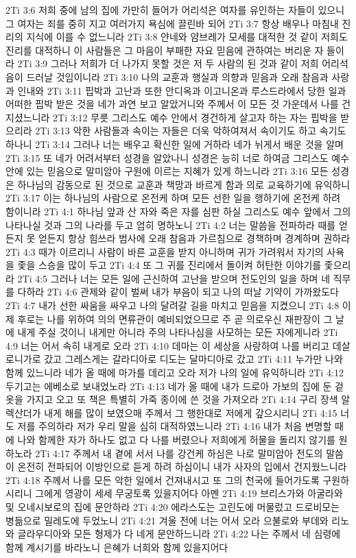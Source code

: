 2Ti 3:6  저희 중에 남의 집에 가만히 들어가 어리석은 여자를 유인하는 자들이 있으니 그 여자는 죄를 중히 지고 여러가지 욕심에 끌린바 되어
2Ti 3:7  항상 배우나 마침내 진리의 지식에 이를 수 없느니라
2Ti 3:8  얀네와 얌브레가 모세를 대적한 것 같이 저희도 진리를 대적하니 이 사람들은 그 마음이 부패한 자요 믿음에 관하여는 버리운 자 들이라
2Ti 3:9  그러나 저희가 더 나가지 못할 것은 저 두 사람의 된 것과 같이 저희 어리석음이 드러날 것임이니라
2Ti 3:10  나의 교훈과 행실과 의향과 믿음과 오래 참음과 사랑과 인내와
2Ti 3:11  핍박과 고난과 또한 안디옥과 이고니온과 루스드라에서 당한 일과 어떠한 핍박 받은 것을 네가 과연 보고 알았거니와 주께서 이 모든 것 가운데서 나를 건지셨느니라
2Ti 3:12  무릇 그리스도 예수 안에서 경건하게 살고자 하는 자는 핍박을 받으리라
2Ti 3:13  악한 사람들과 속이는 자들은 더욱 악하여져서 속이기도 하고 속기도 하나니
2Ti 3:14  그러나 너는 배우고 확신한 일에 거하라 네가 뉘게서 배운 것을 알며
2Ti 3:15  또 네가 어려서부터 성경을 알았나니 성경은 능히 너로 하여금 그리스도 예수 안에 있는 믿음으로 말미암아 구원에 이르는 지혜가 있게 하느니라
2Ti 3:16  모든 성경은 하나님의 감동으로 된 것으로 교훈과 책망과 바르게 함과 의로 교육하기에 유익하니
2Ti 3:17  이는 하나님의 사람으로 온전케 하며 모든 선한 일을 행하기에 온전케 하려 함이니라
2Ti 4:1  하나님 앞과 산 자와 죽은 자를 심판 하실 그리스도 예수 앞에서 그의 나타나실 것과 그의 나라를 두고 엄히 명하노니
2Ti 4:2  너는 말씀을 전파하라 때를 얻든지 못 얻든지 항상 힘쓰라 범사에 오래 참음과 가르침으로 경책하며 경계하며 권하라
2Ti 4:3  때가 이르리니 사람이 바른 교훈을 받지 아니하며 귀가 가려워서 자기의 사욕을 좇을 스승을 많이 두고
2Ti 4:4  또 그 귀를 진리에서 돌이켜 허탄한 이야기를 좇으리라
2Ti 4:5  그러나 너는 모든 일에 근신하여 고난을 받으며 전도인의 일을 하며 네 직무를 다하라
2Ti 4:6  관제와 같이 벌써 내가 부음이 되고 나의 떠날 기약이 가까왔도다
2Ti 4:7  내가 선한 싸움을 싸우고 나의 달려갈 길을 마치고 믿음을 지켰으니
2Ti 4:8  이제 후로는 나를 위하여 의의 면류관이 예비되었으므로 주 곧 의로우신 재판장이 그 날에 내게 주실 것이니 내게만 아니라 주의 나타나심을 사모하는 모든 자에게니라
2Ti 4:9  너는 어서 속히 내게로 오라
2Ti 4:10  데마는 이 세상을 사랑하여 나를 버리고 데살로니가로 갔고 그레스게는 갈라디아로 디도는 달마디아로 갔고
2Ti 4:11  누가만 나와 함께 있느니라 네가 올 때에 마가를 데리고 오라 저가 나의 일에 유익하니라
2Ti 4:12  두기고는 에베소로 보내었노라
2Ti 4:13  네가 올 때에 내가 드로아 가보의 집에 둔 겉옷을 가지고 오고 또 책은 특별히 가죽 종이에 쓴 것을 가져오라
2Ti 4:14  구리 장색 알렉산더가 내게 해를 많이 보였으매 주께서 그 행한대로 저에게 갚으시리니
2Ti 4:15  너도 저를 주의하라 저가 우리 말을 심히 대적하였느니라
2Ti 4:16  내가 처음 변명할 때에 나와 함께한 자가 하나도 없고 다 나를 버렸으나 저희에게 허물을 돌리지 않기를 원하노라
2Ti 4:17  주께서 내 곁에 서서 나를 강건케 하심은 나로 말미암아 전도의 말씀이 온전히 전파되어 이방인으로 듣게 하려 하심이니 내가 사자의 입에서 건지웠느니라
2Ti 4:18  주께서 나를 모든 악한 일에서 건져내시고 또 그의 천국에 들어가도록 구원하시리니 그에게 영광이 세세 무궁토록 있을지어다 아멘
2Ti 4:19  브리스가와 아굴라와 및 오네시보로의 집에 문안하라
2Ti 4:20  에라스도는 고린도에 머물렀고 드로비모는 병듦으로 밀레도에 두었노니
2Ti 4:21  겨울 전에 너는 어서 오라 으불로와 부데와 리노와 글라우디아와 모든 형제가 다 네게 문안하느니라
2Ti 4:22  나는 주께서 네 심령에 함께 계시기를 바라노니 은혜가 너희와 함께 있을지어다


